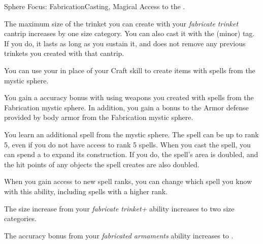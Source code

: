     \begin{magicalfeat}{Sphere Focus: Fabrication}{Casting, Magical}
        \featpre Access to the  .

         The maximum size of the trinket you can create with your \textit{fabricate trinket} cantrip increases by one size category.
        You can also cast it with the  (minor) tag.
        If you do, it lasts as long as you sustain it, and does not remove any previous trinkets you created with that cantrip.

         You can use your  in place of your Craft skill to create items with spells from the  mystic sphere.

         You gain a  accuracy bonus with  using weapons you created with spells from the Fabrication mystic sphere.
        In addition, you gain a  bonus to the Armor defense provided by body armor from the Fabrication mystic sphere.

         You learn an additional spell from the  mystic sphere.
        The spell can be up to rank 5, even if you do not have access to rank 5 spells.
        When you cast the spell, you can spend a  to expand its construction.
        If you do, the spell's area is doubled, and the hit points of any objects the spell creates are also doubled.

        When you gain access to new spell ranks, you can change which spell you know with this ability, including spells with a higher rank.

         The size increase from your \textit{fabricate trinket+} ability increases to two size categories.

         The accuracy bonus from your \textit{fabricated armaments} ability increases to .
    \end{magicalfeat}

